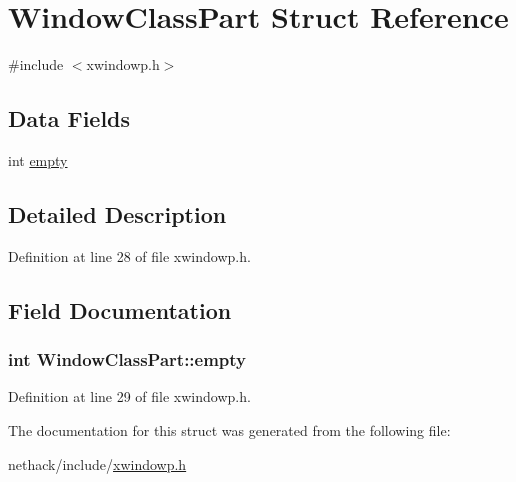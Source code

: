 \hypertarget{structWindowClassPart}{\section{Window\+Class\+Part Struct Reference}
\label{structWindowClassPart}
}


{\ttfamily \#include $<$xwindowp.\+h$>$}

\subsection*{Data Fields}
\begin{DoxyCompactItemize}
\item 
int \hyperlink{structWindowClassPart_a42c3e24cb9dcfe0b6ea7e2a3ebdae443}{empty}
\end{DoxyCompactItemize}


\subsection{Detailed Description}


Definition at line 28 of file xwindowp.\+h.



\subsection{Field Documentation}
\hypertarget{structWindowClassPart_a42c3e24cb9dcfe0b6ea7e2a3ebdae443}{
\subsubsection[{empty}]{\setlength{\rightskip}{0pt plus 5cm}int Window\+Class\+Part\+::empty}}\label{structWindowClassPart_a42c3e24cb9dcfe0b6ea7e2a3ebdae443}


Definition at line 29 of file xwindowp.\+h.



The documentation for this struct was generated from the following file\+:\begin{DoxyCompactItemize}
\item 
nethack/include/\hyperlink{xwindowp_8h}{xwindowp.\+h}\end{DoxyCompactItemize}

